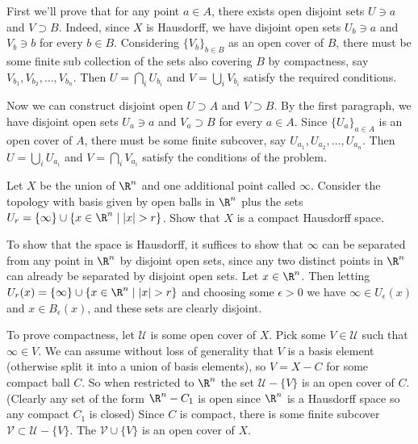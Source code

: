 \documentclass[11pt,letterpaper]{article}
\begin{document}
\begin{solution}
    First we'll prove that for any point $a\in A$, there exists open disjoint sets $U\ni a$ and $V\supset B$. Indeed, since $X$ is Hausdorff, we have disjoint open sets $U_b\ni a$ and $V_b\ni b$ for every $b\in B$. Considering $\{V_b\}_{b\in B}$ as an open cover of $B$, there must be some finite sub collection of the sets also covering $B$ by compactness, say $V_{b_1}, V_{b_2}, \ldots, V_{b_n}$. Then $U=\bigcap_i U_{b_i}$ and $V=\bigcup_i V_{b_i}$ satisfy the required conditions.       
    
    Now we can construct disjoint open $U\supset A$ and $V\supset B$. By the first paragraph, we have disjoint open sets $U_a\ni a$ and $V_a\supset B$ for every $a\in A$. Since $\{U_a\}_{a\in A}$ is an open cover of $A$, there must be some finite subcover, say $U_{a_1}, U_{a_2}, \ldots, U_{a_n}$. Then $U=\bigcup_i U_{a_i}$ and $V=\bigcap_i V_{a_i}$ satisfy the conditions of the problem.   
\end{solution}

\begin{problem}
    Let $X$ be the union of $\R^n$ and one additional point called $\infty$. Consider the topology with basis given by open balls in $\R^n$ plus the sets $U_r=\{\infty\}\cup \{x\in \R^n\mid |x|>r\}$.  Show that $X$ is a compact Hausdorff space.
\end{problem}

\begin{solution}
    To show that the space is Hausdorff, it suffices to show that $\infty$ can be separated from any point in $\R^n$ by disjoint open sets, since any two distinct points in $\R^n$ can already be separated by disjoint open sets. Let $x\in \R^n$. Then letting $U_r(x)=\{\infty\} \cup \{x\in \R^n\mid |x|>r\}$ and choosing some $\epsilon > 0$ we have $\infty \in U_\epsilon(x)$ and $x\in B_{\epsilon}(x)$, and these sets are clearly disjoint. 
    
    To prove compactness, let $\mathcal{U}$ is some open cover of $X$. Pick some $V \in \mathcal{U}$ such that $\infty\in V$. We can assume without loss of generality that $V$ is a basis element (otherwise split it into a union of basis elements), so $V=X-C$ for some compact ball $C$. So when restricted to $\R^n$ the set $\mathcal{U}-\{V\}$ is an open cover of $C$. (Clearly any set of the form $\R^n-C_1$ is open since $\R^n$ is a Hausdorff space so any compact $C_1$ is closed) Since $C$ is compact, there is some finite subcover $\mathcal{V}\subset \mathcal{U} - \{V\}$. The $\mathcal{V}\cup \{V\}$ is an open cover of $X$.  
\end{solution}
\end{document}
